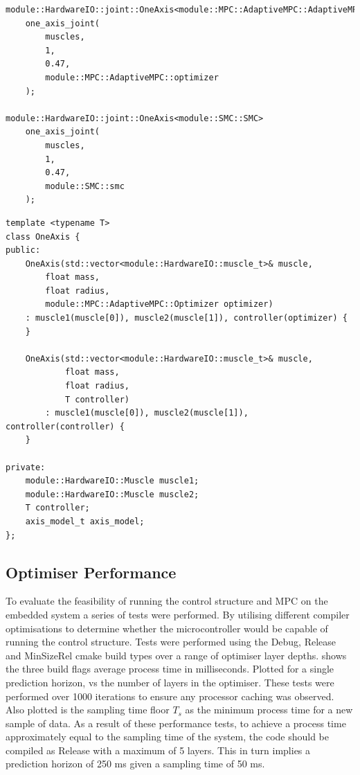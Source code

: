 \documentclass[11pt,a4paper]{article}
\begin{document}
\begin{listing}
\begin{verbatim}
module::HardwareIO::joint::OneAxis<module::MPC::AdaptiveMPC::AdaptiveMPC> 
    one_axis_joint(
        muscles, 
        1, 
        0.47, 
        module::MPC::AdaptiveMPC::optimizer
    );

module::HardwareIO::joint::OneAxis<module::SMC::SMC> 
    one_axis_joint(
        muscles, 
        1, 
        0.47,
        module::SMC::smc
    );
\end{verbatim}
\begin{verbatim}
template <typename T>
class OneAxis {
public:
    OneAxis(std::vector<module::HardwareIO::muscle_t>& muscle,
        float mass,
        float radius,
        module::MPC::AdaptiveMPC::Optimizer optimizer)
    : muscle1(muscle[0]), muscle2(muscle[1]), controller(optimizer) {
    }
    
    OneAxis(std::vector<module::HardwareIO::muscle_t>& muscle, 
            float mass, 
            float radius, 
            T controller)
        : muscle1(muscle[0]), muscle2(muscle[1]), controller(controller) {
    }
    
private:
    module::HardwareIO::Muscle muscle1;
    module::HardwareIO::Muscle muscle2;
    T controller;
    axis_model_t axis_model;
};
\end{verbatim}
\end{listing}

\subsection{Optimiser Performance}
\label{sub:optimiser_performance}
To evaluate the feasibility of running the control structure and MPC on the embedded system a series of tests were performed. By utilising different compiler optimisations to determine whether the microcontroller would be capable of running the control structure. Tests were performed using the Debug, Release and MinSizeRel cmake build types over a range of optimiser layer depths.  shows the three build flags average process time in milliseconds. Plotted for a single prediction horizon, vs the number of layers in the optimiser. These tests were performed over 1000 iterations to ensure any processor caching was observed. Also plotted is the sampling time floor $T_s$ as the minimum process time for a new sample of data. \newline
As a result of these performance tests, to achieve a process time approximately equal to the sampling time of the system, the code should be compiled as Release with a maximum of 5 layers. This in turn implies a prediction horizon of 250 ms given a sampling time of 50 ms.
\end{document}
